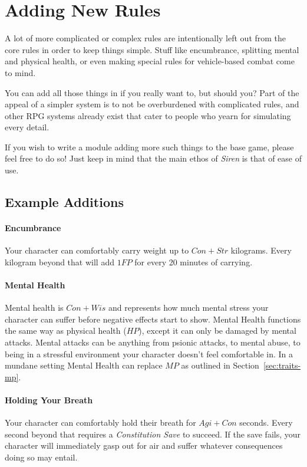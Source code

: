\section{Adding New Rules}
A lot of more complicated or complex rules are intentionally left out from the core rules in order to keep things simple.
Stuff like encumbrance, splitting mental and physical health, or even making special rules for vehicle-based combat come to mind.

You can add all those things in if you really want to, but should you?
Part of the appeal of a simpler system is to not be overburdened with complicated rules, and other RPG systems already exist that cater to people who yearn for simulating every detail.

If you wish to write a module adding more such things to the base game, please feel free to do so! Just keep in mind that the main ethos of \textit{Siren} is that of ease of use.

\subsection{Example Additions}

\paragraph{Encumbrance} Your character can comfortably carry weight up to $Con + Str$ kilograms. 
Every kilogram beyond that will add $1FP$ for every 20 minutes of carrying.

\paragraph{Mental Health} Mental health is $Con + Wis$ and represents how much mental stress your character can suffer before negative effects start to show.
Mental Health functions the same way as physical health ($HP$), except it can only be damaged by mental attacks.
Mental attacks can be anything from psionic attacks, to mental abuse, to being in a stressful environment your character doesn't feel comfortable in.
In a mundane setting Mental Health can replace $MP$ as outlined in Section~\ref{sec:traits-mp}.

\paragraph{Holding Your Breath} Your character can comfortably hold their breath for $Agi + Con$ seconds.
Every second beyond that requires a \textit{Constitution Save} to succeed.
If the save fails, your character will immediately gasp out for air and suffer whatever consequences doing so may entail.

